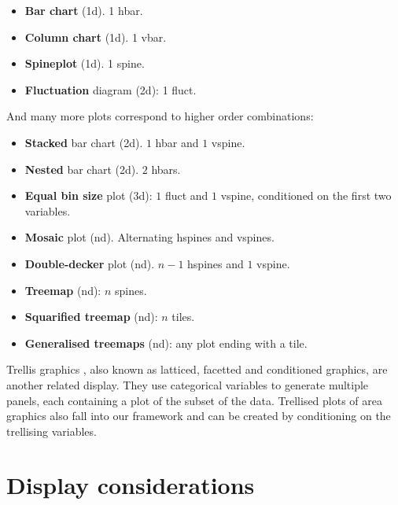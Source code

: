 \documentclass[journal]{vgtc}
\begin{document}
\begin{itemize}
  \setlength{\itemsep}{0em}
  \item {\bf Bar chart} (1d). 1 hbar.
  \item {\bf Column chart} (1d). 1 vbar.
  \item {\bf Spineplot} (1d). 1 spine.
  \item {\bf Fluctuation} diagram (2d): 1 fluct.
\end{itemize}

\noindent And many more plots correspond to higher order combinations:

\begin{itemize}
  \setlength{\itemsep}{0em}
  
  \item {\bf Stacked} bar chart (2d). $1$ hbar and $1$ vspine.

  \item {\bf Nested} bar chart \citep{peltier:2009} (2d). $2$ hbars. 

  \item {\bf Equal bin size} plot \citep{hofmann:2000} (3d): $1$ fluct and $1$ vspine, conditioned on the first two variables.

  \item {\bf Mosaic} plot \citep{hartigan:1981,friendly:1994,hofmann:2003} (nd). Alternating hspines and vspines. 

  \item {\bf Double-decker} plot \citep{hofmann:2001} (nd). $n-1$ hspines and $1$ vspine. 

  \item {\bf Treemap} \citep{shneiderman:1992} (nd): $n$ spines.

  \item {\bf Squarified treemap} \citep{bruls:1999} (nd): $n$ tiles.

  \item {\bf Generalised treemaps} \citep{vliegen:2006} (nd): any plot ending with a tile.

\end{itemize}

Trellis graphics \citep{becker:1996}, also known as latticed, facetted and conditioned graphics, are another related display. They use categorical variables to generate multiple panels, each containing a plot of the subset of the data. Trellised plots of area graphics also fall into our framework and can be created by conditioning on the trellising variables.

\section{Display considerations}
\label{sec:display}
\end{document}
